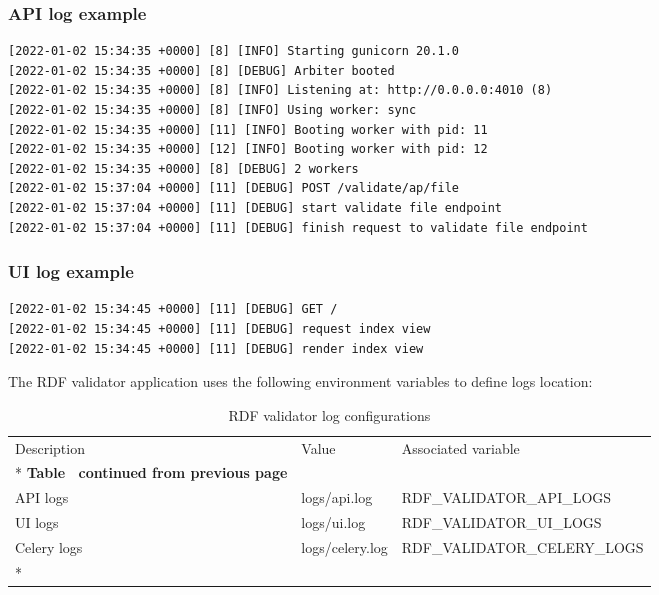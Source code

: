 \subsubsection{API log example}
\begin{lstlisting}
[2022-01-02 15:34:35 +0000] [8] [INFO] Starting gunicorn 20.1.0
[2022-01-02 15:34:35 +0000] [8] [DEBUG] Arbiter booted
[2022-01-02 15:34:35 +0000] [8] [INFO] Listening at: http://0.0.0.0:4010 (8)
[2022-01-02 15:34:35 +0000] [8] [INFO] Using worker: sync
[2022-01-02 15:34:35 +0000] [11] [INFO] Booting worker with pid: 11
[2022-01-02 15:34:35 +0000] [12] [INFO] Booting worker with pid: 12
[2022-01-02 15:34:35 +0000] [8] [DEBUG] 2 workers
[2022-01-02 15:37:04 +0000] [11] [DEBUG] POST /validate/ap/file
[2022-01-02 15:37:04 +0000] [11] [DEBUG] start validate file endpoint
[2022-01-02 15:37:04 +0000] [11] [DEBUG] finish request to validate file endpoint
\end{lstlisting}

\subsubsection{UI log example}
\begin{lstlisting}
[2022-01-02 15:34:45 +0000] [11] [DEBUG] GET /
[2022-01-02 15:34:45 +0000] [11] [DEBUG] request index view
[2022-01-02 15:34:45 +0000] [11] [DEBUG] render index view
\end{lstlisting}

The RDF validator application uses the following environment variables to define logs location:

\begin{longtable}[c]{@{}p{3.5cm}p{3.5cm}l@{}}
	\toprule
	Description & Value           & Associated variable          \\* \midrule
	\endfirsthead
	\multicolumn{3}{c}%
	{{\bfseries Table \thetable\ continued from previous page}}  \\
	\endhead
	\bottomrule
	\endfoot
	\endlastfoot
	API logs    & logs/api.log    & RDF\_VALIDATOR\_API\_LOGS    \\
	UI logs     & logs/ui.log     & RDF\_VALIDATOR\_UI\_LOGS     \\
	Celery logs & logs/celery.log & RDF\_VALIDATOR\_CELERY\_LOGS \\* \bottomrule
	\caption{RDF validator log configurations}
	\label{tab:rdf-validator-log}                                \\
\end{longtable}
